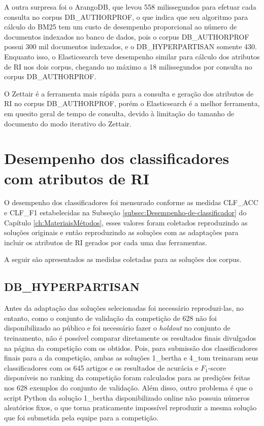 			A outra surpresa foi o ArangoDB, que levou 558 milissegundos para efetuar cada consulta no corpus DB\_AUTHORPROF, o que indica que seu algoritmo para cálculo do BM25 tem um custo de desempenho proporcional ao número de documentos indexados no banco de dados, pois o corpus DB\_AUTHORPROF possui 300 mil documentos indexados, e o DB\_HYPERPARTISAN somente 430.
			Enquanto isso, o Elasticsearch teve desempenho similar para cálculo dos atributos de RI nos dois corpus, chegando no máximo a 18 milissegundos por consulta no corpus DB\_AUTHORPROF.

			O Zettair é a ferramenta mais rápida para a consulta e geração dos atributos de RI no corpus DB\_AUTHORPROF, porém o Elasticsearch é a melhor ferramenta, em quesito geral de tempo de consulta, devido à limitação do tamanho de documento do modo iterativo do Zettair.

	\section{Desempenho dos classificadores com atributos de RI} \label{sec:DesempenhoClassificadores}
		O desempenho dos classificadores foi mensurado conforme as medidas CLF\_ACC e CLF\_F1 estabelecidas na Subseção \ref{subsec:Desempenho-de-classificador} do Capítulo \ref{ch:MateriaisMétodos}, esses valores foram coletados reproduzindo as soluções originais e então reproduzindo as soluções com as adaptações para incluir os atributos de RI gerados por cada uma das ferramentas.

		A seguir são apresentados as medidas coletadas para as soluções dos corpus.

		\subsection{DB\_HYPERPARTISAN}
			Antes da adaptação das soluções selecionadas foi necessário reproduzi-las, no entanto, como o conjunto de validação da competição de 628 não foi disponibilizado ao público e foi necessário fazer o \textit{holdout} no conjunto de treinamento, não é possível comparar diretamente os resultados finais divulgados na página da competição com os obtidos.
			Pois, para submissão dos classificadores finais para a da competição, ambas as soluções 1\_bertha e 4\_tom treinaram seus classificadores com os 645 artigos e os resultados de acurácia e $F_1$-score disponíveis no ranking da competição foram calculados para as predições feitas nos 628 exemplos do conjunto de validação.
			Além disso, outro problema é que o script Python da solução 1\_bertha disponibilizado online não possuia números aleatórios fixos, o que torna praticamente impossível reproduzir a mesma solução que foi submetida pela equipe para a competição.

